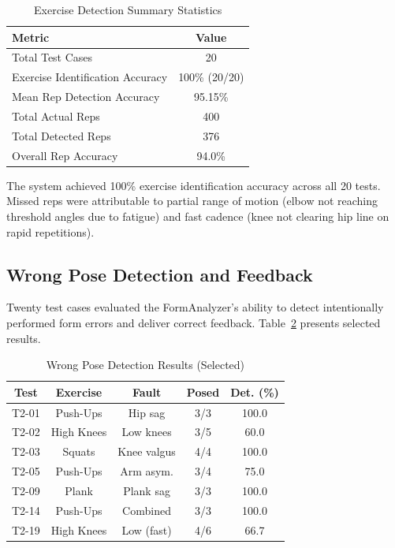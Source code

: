 \documentclass[conference]{IEEEtran}
\begin{document}
\begin{table}[htbp]
\caption{Exercise Detection Summary Statistics}
\begin{center}
\begin{tabular}{|l|c|}
\hline
\textbf{Metric} & \textbf{Value} \\
\hline
Total Test Cases & 20 \\
Exercise Identification Accuracy & 100\% (20/20) \\
Mean Rep Detection Accuracy & 95.15\% \\
Total Actual Reps & 400 \\
Total Detected Reps & 376 \\
Overall Rep Accuracy & 94.0\% \\
\hline
\end{tabular}
\label{tab:repsummary}
\end{center}
\end{table}

The system achieved 100\% exercise identification accuracy across all 20 tests. Missed reps were attributable to partial range of motion (elbow not reaching threshold angles due to fatigue) and fast cadence (knee not clearing hip line on rapid repetitions).

\subsection{Wrong Pose Detection and Feedback}

Twenty test cases evaluated the FormAnalyzer's ability to detect intentionally performed form errors and deliver correct feedback. Table~\ref{tab:poseresults} presents selected results.

\begin{table}[htbp]
\caption{Wrong Pose Detection Results (Selected)}
\begin{center}
\begin{tabular}{|c|c|c|c|c|}
\hline
\textbf{Test} & \textbf{Exercise} & \textbf{Fault} & \textbf{Posed} & \textbf{Det. (\%)} \\
\hline
T2-01 & Push-Ups & Hip sag & 3/3 & 100.0 \\
T2-02 & High Knees & Low knees & 3/5 & 60.0 \\
T2-03 & Squats & Knee valgus & 4/4 & 100.0 \\
T2-05 & Push-Ups & Arm asym. & 3/4 & 75.0 \\
T2-09 & Plank & Plank sag & 3/3 & 100.0 \\
T2-14 & Push-Ups & Combined & 3/3 & 100.0 \\
T2-19 & High Knees & Low (fast) & 4/6 & 66.7 \\
\hline
\end{tabular}
\label{tab:poseresults}
\end{center}
\end{table}
\end{document}

